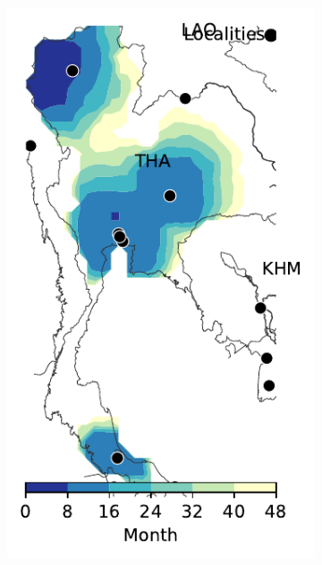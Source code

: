 \documentclass[11pt]{article}
\theoremstyle{definition}
\begin{document}
\begin{figure}[ht]
\begin{subfigure}[b]{.135\textwidth}
    \includegraphics[width=\textwidth]{TH_model-B_precip1_m1_l3.pdf}
\caption{\label{fig:thlBContour}} %
\end{subfigure}
\begin{subfigure}[b]{.135\textwidth}

\end{subfigure}
\end{figure}
\end{document}
